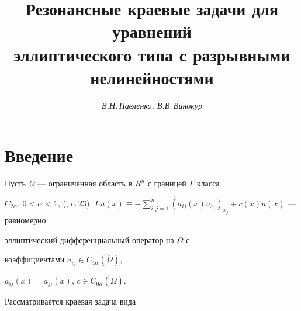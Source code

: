 








\author{\it В.Н.\,Павленко, В.В.\,Винокур}




\title{Резонансные краевые задачи для уравнений\\


эллиптического типа с разрывными нелинейностями}





\date{}




\pagestyle{plain} %







\maketitle


\label{begin}





\section*{Введение}


\setcounter{section}{0}





Пусть $\Omega$ --- ограниченная область в $R^n$ с границей $\Gamma$ класса


$C_{2 \alpha}$, $0< \alpha <1$, (\cite{n1}, c.\,23), $Lu(x) \equiv -


\sum\limits_{i,j=1}^n (a_{ij}(x)u_{x_i})_{x_j}+c(x)u(x)$ --- равномерно


эллиптический дифференциальный оператор на $\overline{ \Omega}$ с


коэффициентами $a_{ij} \in C_{1 \alpha}( \overline{ \Omega })$,


$a_{ij}(x)=a_{ji}(x)$, $c \in C_{0 \alpha }( \overline{ \Omega})$.


Рассматривается краевая задача вида


